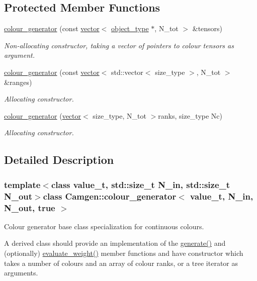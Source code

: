 \subsection*{Protected Member Functions}
\begin{DoxyCompactItemize}
\item 
\hyperlink{a00079_ab6b2c982b0f27ca8d2ffa744ca25b6ff}{colour\+\_\+generator} (const \hyperlink{a00579}{vector}$<$ \hyperlink{a00541}{object\+\_\+type} $\ast$, N\+\_\+tot $>$ \&tensors)
\begin{DoxyCompactList}\small\item\em Non-\/allocating constructor, taking a vector of pointers to colour tensors as argument. \end{DoxyCompactList}\item 
\hyperlink{a00079_a3e163e543ea1f6afd5c9a749298b528e}{colour\+\_\+generator} (const \hyperlink{a00579}{vector}$<$ std\+::vector$<$ size\+\_\+type $>$, N\+\_\+tot $>$ \&ranges)
\begin{DoxyCompactList}\small\item\em Allocating constructor. \end{DoxyCompactList}\item 
\hyperlink{a00079_a8546e9ed5da4e0b2c824c5022bf6395c}{colour\+\_\+generator} (\hyperlink{a00579}{vector}$<$ size\+\_\+type, N\+\_\+tot $>$ranks, size\+\_\+type Nc)
\begin{DoxyCompactList}\small\item\em Allocating constructor. \end{DoxyCompactList}\end{DoxyCompactItemize}


\subsection{Detailed Description}
\subsubsection*{template$<$class value\+\_\+t, std\+::size\+\_\+t N\+\_\+in, std\+::size\+\_\+t N\+\_\+out$>$class Camgen\+::colour\+\_\+generator$<$ value\+\_\+t, N\+\_\+in, N\+\_\+out, true $>$}

Colour generator base class specialization for continuous colours. 

A derived class should provide an implementation of the \hyperlink{a00366_a197b7bb66d8de5f6de401f81bea71e6c}{generate()} and (optionally) \hyperlink{a00366_a0eb3cb6ba8fb5a5c29817e12fbb1519c}{evaluate\+\_\+weight()} member functions and have constructor which takes a number of colours and an array of colour ranks, or a tree iterator as arguments. 

